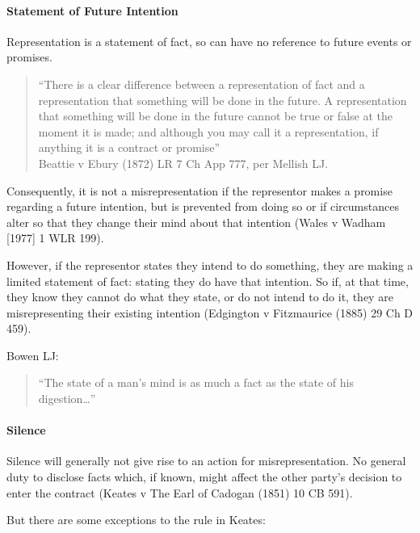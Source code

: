 \documentclass[
]{article}
\begin{document}
\hypertarget{statement-of-future-intention}{%
\paragraph{Statement of Future
Intention}\label{statement-of-future-intention}}

Representation is a statement of fact, so can have no reference to
future events or promises.

\begin{quote}
``There is a clear difference between a representation of fact and a
representation that something will be done in the future. A
representation that something will be done in the future cannot be true
or false at the moment it is made; and although you may call it a
representation, if anything it is a contract or promise''\\
Beattie v Ebury (1872) LR 7 Ch App 777, per Mellish LJ.
\end{quote}

Consequently, it is not a misrepresentation if the representor makes a
promise regarding a future intention, but is prevented from doing so or
if circumstances alter so that they change their mind about that
intention (Wales v Wadham {[}1977{]} 1 WLR 199).

However, if the representor states they intend to do something, they are
making a limited statement of fact: stating they do have that intention.
So if, at that time, they know they cannot do what they state, or do not
intend to do it, they are misrepresenting their existing intention
(Edgington v Fitzmaurice (1885) 29 Ch D 459).

Bowen LJ:

\begin{quote}
``The state of a man's mind is as much a fact as the state of his
digestion\ldots''
\end{quote}

\hypertarget{silence}{%
\paragraph{Silence}\label{silence}}

Silence will generally not give rise to an action for misrepresentation.
No general duty to disclose facts which, if known, might affect the
other party's decision to enter the contract (Keates v The Earl of
Cadogan (1851) 10 CB 591).

But there are some exceptions to the rule in Keates:
\end{document}
